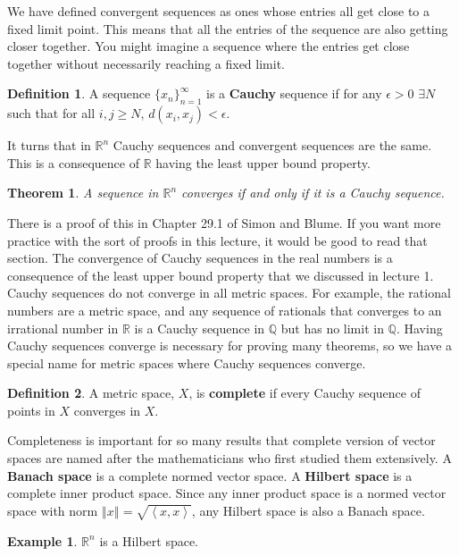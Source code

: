 \documentclass[12pt,reqno]{amsart}
\newtheorem{theorem}{Theorem}[section]
\theoremstyle{definition}
\newtheorem{definition}{Definition}[section]
\newtheorem{example}{Example}[section]
\def\R{\mathbb{R}}
\newcommand{\iprod}[2]{\left\langle {#1} , {#2} \right\rangle}
\newcommand{\norm}[1]{\left\Vert {#1} \right\Vert}
\newcommand{\seq}[1]{\{{#1}_n \}_{n=1}^\infty }
\begin{document}
We have defined convergent sequences as ones whose entries all get
close to a fixed limit point. This means that all the entries of the
sequence are also getting closer together. You might imagine a
sequence where the entries get close together without necessarily
reaching a fixed limit.
\begin{definition}
  A sequence $\seq{x}$ is a \textbf{Cauchy} sequence if for any
  $\epsilon > 0$ $\exists N$ such that for all $i,j\geq N$,
  $d(x_i,x_j) < \epsilon$.
\end{definition}
It turns that in $\R^n$ Cauchy sequences and convergent sequences are
the same. This is a consequence of $\R$ having the least upper bound
property. 
\begin{theorem}
  A sequence in $\R^n$ converges if and only if it is a Cauchy
  sequence. 
\end{theorem}
There is a proof of this in Chapter 29.1 of Simon and Blume. If you
want more practice with the sort of proofs in this lecture, it would
be good to read that section. The convergence of Cauchy sequences in
the real numbers is a consequence of the least upper bound property
that we discussed in lecture 1. Cauchy sequences do not converge in
all metric spaces. For example, the rational numbers are a metric
space, and any sequence of rationals that converges to an irrational
number in $\R$ is a Cauchy sequence in $\mathbb{Q}$ but has no limit
in $\mathbb{Q}$. Having Cauchy sequences converge is necessary for
proving many theorems, so we have a special name for metric spaces
where Cauchy sequences converge.
\begin{definition}
  A metric space, $X$, is \textbf{complete} if every Cauchy sequence of
  points in $X$ converges in $X$.
\end{definition}
Completeness is important for so many results that complete version of
vector spaces are named after the mathematicians who first studied
them extensively. A \textbf{Banach space} is a complete normed vector
space. A \textbf{Hilbert space} is a complete inner product
space. Since any inner product space is a normed vector space with
norm $\norm{x} = \sqrt{\iprod{x}{x}}$, any Hilbert space is also a
Banach space. 
\begin{example}
  $\R^n$ is a Hilbert space.
\end{example}
\end{document}
